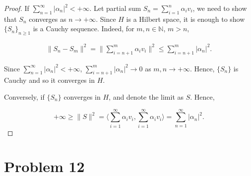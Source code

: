 \documentclass[12pt]{article}
\begin{document}
\begin{proof}

If $\sum_{n=1}^\infty |\alpha_n|^2 <+\infty $. Let partial sum $S_n = \sum_{i=1}^n \alpha_i v_i$, we need to show that $S_n$ converges as $n\rightarrow +\infty$. Since $H$ is a Hilbert space, it is enough to show $\{S_n\}_{n\geqslant 1}$ is a Cauchy sequence. Indeed, for $m, n \in \mathbb N$, $m > n$, 

$$
\begin{aligned}
\|S_n - S_m\|^2 = \|\sum_{i = n+1}^m \alpha_i v_i\|^2 \leqslant \sum_{i = n+1}^m |\alpha_n|^2.
\end{aligned}
$$

Since $\sum_{n=1}^\infty |\alpha_n|^2 <+\infty $, $\sum_{i = n+1}^m |\alpha_n|^2 \rightarrow 0$ as $m, n\rightarrow +\infty$. Hence, $\{S_n\}$ is Cauchy and so it converges in $H$.

Conversely, if $\{S_n\}$ converges in $H$, and denote the limit as $S$. Hence,  

$$
 +\infty \geqslant \|S\|^2 = \langle \sum_{i = 1}^\infty \alpha_i v_i, \sum_{i = 1}^\infty \alpha_i v_i \rangle = \sum_{n=1}^\infty |\alpha_n|^2.
$$

\end{proof}


\section*{Problem 12}
\end{document}
